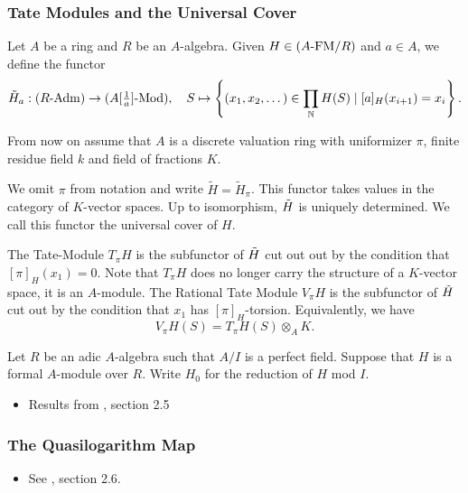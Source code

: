 \subsubsection{Tate Modules and the Universal Cover} %
\label{sub:Tate Modules and the Universal Cover}
Let $A$ be a ring and $R$ be an $A$-algebra. Given $H \in {({A}\text-\mathrm{FM}/{R})}$ and $a \in A$,
we define the functor 
\begin{equation*}
  \Tilde H_a : {({R}\text-\mathrm{Adm})} \to {({A[\tfrac 1a]}\text-\mathrm{Mod})}, \quad
  S \mapsto \left\{(x_1, x_2, \dots) \in \prod_{\mathbb{N}} H(S) \mid [a]_H(x_{i+1}) =
  x_i \right\}.
\end{equation*}

From now on assume that $A$ is a discrete valuation ring with uniformizer
$\pi$, finite residue field $k$ and field of fractions $K$. 

\begin{defi}
  We omit $\pi$ from notation and write $\tilde H = \tilde H_\pi$. This functor
  takes values in the category of $K$-vector spaces.
  Up to isomorphism, $\Tilde H$ is uniquely determined. We call this functor
  the universal cover of $H$. 

  The Tate-Module $T_\pi H$ is the subfunctor of $\Tilde H$ cut out out
  by the condition that $[\pi]_H(x_1) = 0$. Note that $T_\pi H$ does no longer 
  carry the structure of a $K$-vector space, it is an $A$-module. The Rational
  Tate Module $V_\pi H$ is the subfunctor of $\Tilde H$ cut out by the
  condition that $x_1$ has $[\pi]_H$-torsion. Equivalently, we have 
  \begin{equation*}
    V_\pi H (S) = T_\pi H(S) \otimes_A K.
  \end{equation*}
\end{defi}

Let $R$ be an adic $A$-algebra such that $A/I$ is a perfect field. Suppose that
$H$ is a formal $A$-module over $R$. Write $H_0$ for the reduction of $H$ mod $I$. 

\begin{itemize}
  \item Results from \cite{BoyarchenkoWeinstein2011MaxVar}, section 2.5
\end{itemize}



\subsubsection{The Quasilogarithm Map} %
\label{ssub:The Quasilogarithm map}
\begin{itemize}
  \item See \cite{BoyarchenkoWeinstein2011MaxVar}, section 2.6.
\end{itemize}

